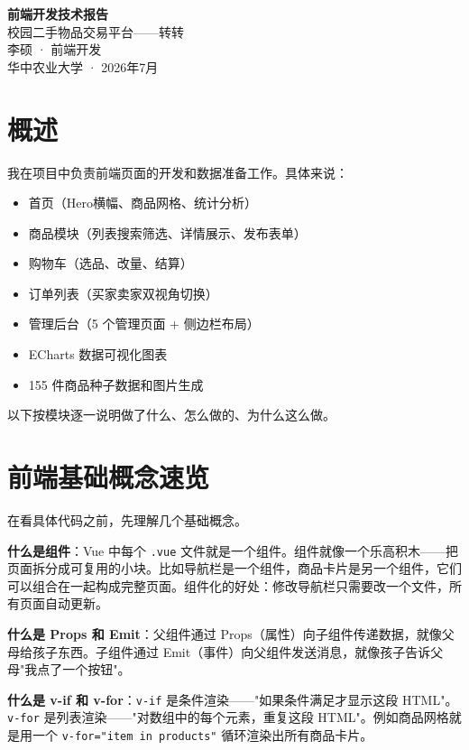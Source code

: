 \documentclass[12pt,a4paper]{ctexart}
\begin{document}
\begin{titlepage}
\centering\vspace*{3cm}
{\Huge\bfseries 前端开发技术报告}\\[0.5cm]
{\LARGE 校园二手物品交易平台——转转}\\[1.5cm]
{\Large 李硕 · 前端开发}\\[0.3cm]
{\large 华中农业大学 · 2026年7月}
\end{titlepage}

\tableofcontents\newpage

\section{概述}

我在项目中负责前端页面的开发和数据准备工作。具体来说：
\begin{itemize}
  \item 首页（Hero横幅、商品网格、统计分析）
  \item 商品模块（列表搜索筛选、详情展示、发布表单）
  \item 购物车（选品、改量、结算）
  \item 订单列表（买家卖家双视角切换）
  \item 管理后台（5 个管理页面 + 侧边栏布局）
  \item ECharts 数据可视化图表
  \item 155 件商品种子数据和图片生成
\end{itemize}

以下按模块逐一说明做了什么、怎么做的、为什么这么做。

\section{前端基础概念速览}

在看具体代码之前，先理解几个基础概念。

\textbf{什么是组件}：Vue 中每个 \texttt{.vue} 文件就是一个组件。组件就像一个乐高积木——把页面拆分成可复用的小块。比如导航栏是一个组件，商品卡片是另一个组件，它们可以组合在一起构成完整页面。组件化的好处：修改导航栏只需要改一个文件，所有页面自动更新。

\textbf{什么是 Props 和 Emit}：父组件通过 Props（属性）向子组件传递数据，就像父母给孩子东西。子组件通过 Emit（事件）向父组件发送消息，就像孩子告诉父母"我点了一个按钮"。

\textbf{什么是 v-if 和 v-for}：\texttt{v-if} 是条件渲染——"如果条件满足才显示这段 HTML"。\texttt{v-for} 是列表渲染——"对数组中的每个元素，重复这段 HTML"。例如商品网格就是用一个 \texttt{v-for="item in products"} 循环渲染出所有商品卡片。
\end{document}

